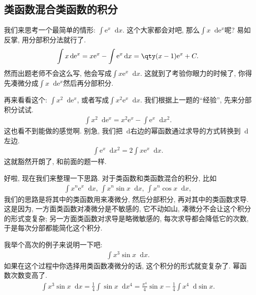 \documentclass{ctexbook}
\newcommand{\e}{\mathrm{e}}
\newcommand*{\dif}{\mathop{}\!\mathrm{d}}
\begin{document}
{\subsection{\uppercase\expandafter{}类函数混合\uppercase\expandafter{}类函数的积分}
我们来思考一个最简单的情形: $\int\e^{x}\dif{x}$. 这个大家都会对吧, 那么$\int x\dif{\e^{x}}$呢? 易如反掌, 用分部积分法就行了. 
\begin{align*}
\int x\dif{\e^{x}}=x\e^{x}-\int\e^{x}\dif{x}=\qty(x-1)\e^{x}+C
.\end{align*}
然而出题老师不会这么写, 他会写成$\int x\e^{x}\dif{x}$. 这就到了考验你眼力的时候了, 你得先凑微分成$\int x\dif{\e^{x}}$然后再分部积分. \par
再来看看这个: $\int x^{2}\dif{\e^{x}}$, 或者写成$\int x^{2}\e^{x}\dif{x}$. 我们根据上一题的“经验”, 先来分部积分试试. 
\begin{align*}
\int x^{2}\dif{\e^{x}}=x^{2}\e^{x}-\int\e^{x}\dif{x^{2}}
.\end{align*}
这也看不到能做的感觉啊. 别急, 我们把$\dif$右边的幂函数通过求导的方式转换到$\dif$左边. 
\begin{align*}
\int\e^{x}\dif{x^{2}}=2\int x\e^{x}\dif{x}
.\end{align*}
这就豁然开朗了, 和前面的题一样. \par
好啦, 现在我们来整理一下思路. 对于\uppercase\expandafter{}类函数和\uppercase\expandafter{}类函数混合的积分, 比如
\begin{align*}
\int x^{n}\e^{x}\dif{x},\,\int x^{n}\sin{x}\dif{x},\,\int x^{n}\cos{x}\dif{x}
,\end{align*}
我们的思路是将其中的\uppercase\expandafter{}类函数用来凑微分, 然后分部积分, 再对其中的\uppercase\expandafter{}类函数求导. 这是因为, 一方面\uppercase\expandafter{}类函数对凑微分是不敏感的, 它不动如山, 凑微分不会让这个积分的形式变复杂; 另一方面\uppercase\expandafter{}类函数对求导是略微敏感的, 每次求导都会降低它的次数, 于是每次分部都能简化这个积分. \par
我举个高次的例子来说明一下吧: 
\begin{align*}
\int x^{3}\sin{x}\dif{x}
.\end{align*}
如果在这个过程中你选择用\uppercase\expandafter{}类函数凑微分的话, 这个积分的形式就变复杂了. 幂函数次数变高了. 
\begin{align*}
\int x^{3}\sin{x}\dif{x}=\frac{1}{4}\int\sin{x}\dif{x^{4}}=\frac{x^{4}}{4}\sin{x}-\frac{1}{4}\int x^{4}\dif{\sin{x}}
.\end{align*}
}
\end{document}
